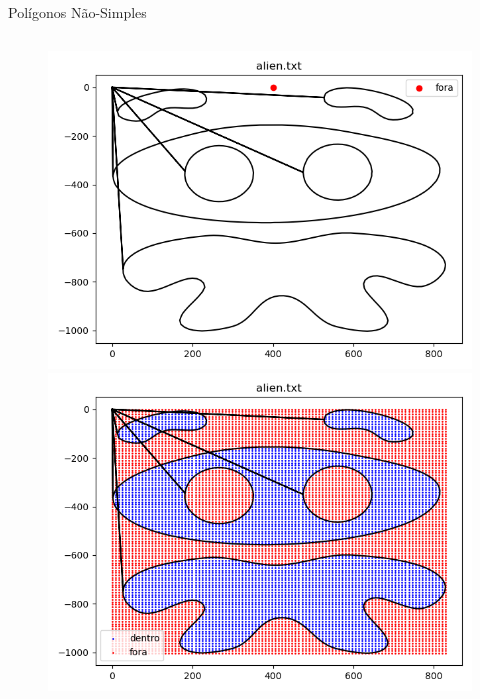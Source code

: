 \documentclass[aspectratio=169]{beamer}
\begin{document}
\begin{frame}{Polígonos Não-Simples}
  
  \begin{columns}
    \begin{center}
      \begin{figure}
        \begin{overprint}
        \includegraphics[width=1.0\textwidth]{figures/alien.png}
        \includegraphics[width=1.0\textwidth]{figures/alien_grid.png}
        \end{overprint}
      \end{figure}
    \end{center}

\end{columns}
\end{frame}
\end{document}

